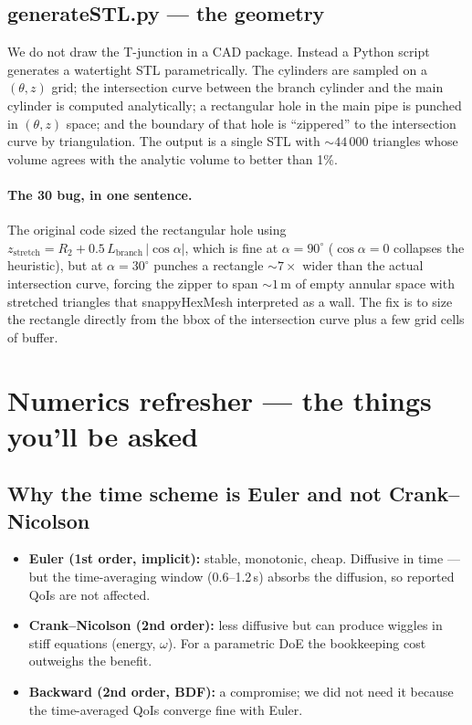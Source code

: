\documentclass[11pt,a4paper]{article}
\begin{document}
\subsection{generateSTL.py --- the geometry}

We do not draw the T-junction in a CAD package. Instead a Python
script generates a watertight STL parametrically. The cylinders are
sampled on a $(\theta, z)$ grid; the intersection curve between the
branch cylinder and the main cylinder is computed analytically; a
rectangular hole in the main pipe is punched in $(\theta, z)$ space;
and the boundary of that hole is ``zippered'' to the intersection
curve by triangulation. The output is a single STL with $\sim 44\,000$
triangles whose volume agrees with the analytic volume to better
than 1\%.

\paragraph{The 30\textdegree{} bug, in one sentence.}
The original code sized the rectangular hole using
\(z_\mathrm{stretch} = R_2 + 0.5\,L_\mathrm{branch}\,|\!\cos\alpha|\),
which is fine at $\alpha = 90^\circ$ ($\cos\alpha = 0$ collapses the
heuristic), but at $\alpha = 30^\circ$ punches a rectangle
$\sim 7\times$ wider than the actual intersection curve, forcing the
zipper to span $\sim 1$\,m of empty annular space with stretched
triangles that snappyHexMesh interpreted as a wall. The fix is to size
the rectangle directly from the bbox of the intersection curve plus
a few grid cells of buffer.

\clearpage
\section{Numerics refresher --- the things you'll be asked}

\subsection{Why the time scheme is Euler and not Crank--Nicolson}

\begin{itemize}[leftmargin=1.5em,topsep=2pt]
    \item \textbf{Euler (1st order, implicit):} stable, monotonic,
    cheap. Diffusive in time --- but the time-averaging window
    (0.6--1.2\,s) absorbs the diffusion, so reported QoIs are not
    affected.
    \item \textbf{Crank--Nicolson (2nd order):} less diffusive but
    can produce wiggles in stiff equations (energy, $\omega$). For a
    parametric DoE the bookkeeping cost outweighs the benefit.
    \item \textbf{Backward (2nd order, BDF):} a compromise; we did
    not need it because the time-averaged QoIs converge fine with
    Euler.
\end{itemize}
\end{document}
